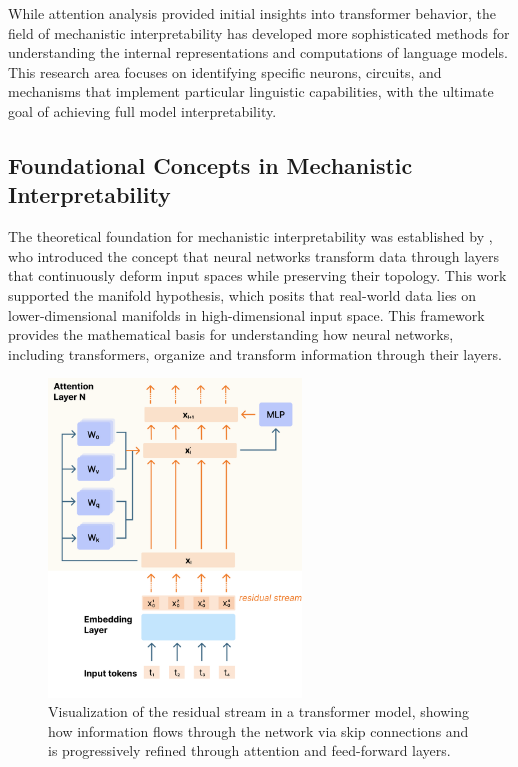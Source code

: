 While attention analysis provided initial insights into transformer behavior, the field of mechanistic interpretability has developed more sophisticated methods for understanding the internal representations and computations of language models. This research area focuses on identifying specific neurons, circuits, and mechanisms that implement particular linguistic capabilities, with the ultimate goal of achieving full model interpretability.

\subsection{Foundational Concepts in Mechanistic Interpretability}

The theoretical foundation for mechanistic interpretability was established by \citet{olah2014manifolds}, who introduced the concept that neural networks transform data through layers that continuously deform input spaces while preserving their topology. This work supported the manifold hypothesis, which posits that real-world data lies on lower-dimensional manifolds in high-dimensional input space. This framework provides the mathematical basis for understanding how neural networks, including transformers, organize and transform information through their layers.


\begin{figure}[ht!]
    \centering
    \includegraphics[width=0.6\textwidth]{chapters/analysis_background/figures/residual_stream_visualization.pdf}
    \caption{Visualization of the residual stream in a transformer model, showing how information flows through the network via skip connections and is progressively refined through attention and feed-forward layers.}
    \label{fig:residual-stream}
\end{figure}

